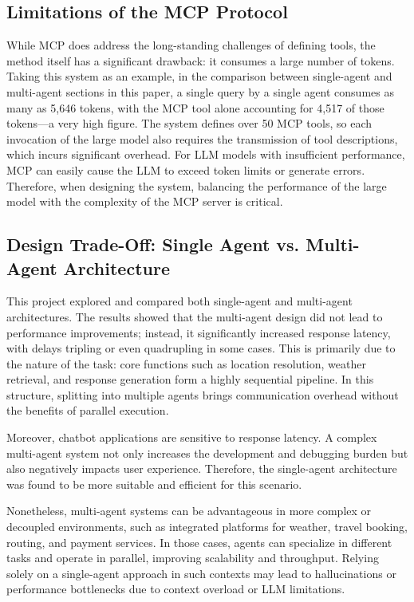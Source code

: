 \documentclass[final-report]{report-template}
\begin{document}
\subsection{Limitations of the MCP Protocol}
While MCP does address the long-standing challenges of defining tools, the method itself has a significant drawback: it consumes a large number of tokens. Taking this system as an example, in the comparison between single-agent and multi-agent sections in this paper, a single query by a single agent consumes as many as 5,646 tokens, with the MCP tool alone accounting for 4,517 of those tokens—a very high figure. The system defines over 50 MCP tools, so each invocation of the large model also requires the transmission of tool descriptions, which incurs significant overhead. For LLM models with insufficient performance, MCP can easily cause the LLM to exceed token limits or generate errors. Therefore, when designing the system, balancing the performance of the large model with the complexity of the MCP server is critical.

\subsection{Design Trade-Off: Single Agent vs. Multi-Agent Architecture}

This project explored and compared both single-agent and multi-agent architectures. The results showed that the multi-agent design did not lead to performance improvements; instead, it significantly increased response latency, with delays tripling or even quadrupling in some cases. This is primarily due to the nature of the task: core functions such as location resolution, weather retrieval, and response generation form a highly sequential pipeline. In this structure, splitting into multiple agents brings communication overhead without the benefits of parallel execution.

Moreover, chatbot applications are sensitive to response latency. A complex multi-agent system not only increases the development and debugging burden but also negatively impacts user experience. Therefore, the single-agent architecture was found to be more suitable and efficient for this scenario.

Nonetheless, multi-agent systems can be advantageous in more complex or decoupled environments, such as integrated platforms for weather, travel booking, routing, and payment services. In those cases, agents can specialize in different tasks and operate in parallel, improving scalability and throughput. Relying solely on a single-agent approach in such contexts may lead to hallucinations or performance bottlenecks due to context overload or LLM limitations.
\end{document}
